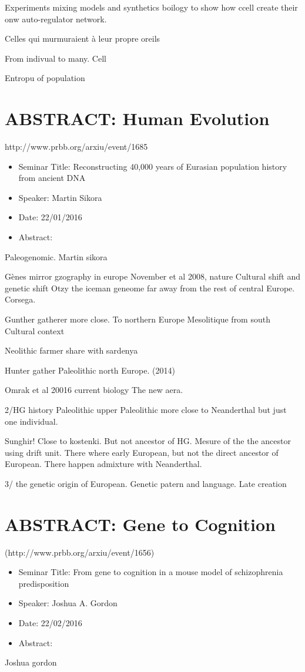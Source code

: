 \documentclass[10pt,letterpaper]{article}
\begin{document}
Experiments mixing models and synthetics boilogy to show how ccell create their onw auto-regulator network.

Celles qui murmuraient à leur propre oreils

From indivual to many. Cell

Entropu of population


\section{ABSTRACT: Human Evolution}
http://www.prbb.org/arxiu/event/1685

\begin{itemize}
    \item Seminar Title: Reconstructing 40,000 years of Eurasian population history from ancient DNA
    \item Speaker: Martin Sikora
    \item Date: 22/01/2016
    \item Abstract: 
\end{itemize}
Paleogenomic. Martin sikora

Gènes mirror gzography in europe
November et al 2008, nature
Cultural shift and genetic shift
Otzy the iceman geneome far away from the rest of central Europe.
Corsega.

Gunther gatherer more close. To northern Europe
Mesolitique from south
Cultural context

Neolithic farmer share with sardenya

Hunter gather Paleolithic north Europe.
(2014)

Omrak et al 20016 current biology
The new aera.

2/HG history Paleolithic upper Paleolithic more close to Neanderthal but just one individual.

Sunghir!
Close to kostenki. But not ancestor of HG. Mesure of the the ancestor using drift unit.
There where early European, but not the direct ancestor of European.
There happen admixture with Neanderthal.

3/ the genetic origin of European.
Genetic patern and language. Late creation


\section{ABSTRACT: Gene to Cognition}
(http://www.prbb.org/arxiu/event/1656)
\begin{itemize}
    \item Seminar Title: From gene to cognition in a mouse model of schizophrenia predisposition
    \item Speaker: Joshua A. Gordon
    \item Date: 22/02/2016
    \item Abstract:
\end{itemize}
Joshua gordon
\end{document}
